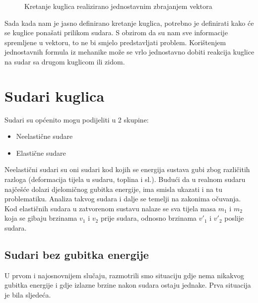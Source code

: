 \begin{figure}[!http]
	\begin{center}
	\end{center}
	\caption {Kretanje kuglica realizirano jednostavnim zbrajanjem vektora}
	\label{fig:14}
\end{figure}

Sada kada nam je jasno definirano kretanje kuglica, potrebno je definirati kako će se kuglice ponašati prilikom sudara. S obzirom da su nam sve informacije spremljene u vektoru, to ne bi smjelo predstavljati problem. Korištenjem jednostavnih formula iz mehanike može se vrlo jednostavno dobiti reakcija kuglice na sudar sa drugom kuglicom ili zidom.

\section{Sudari kuglica}

Sudari su općenito mogu podijeliti u 2 skupine:
\begin{itemize}
	\item Neelastične sudare
	\item Elastične sudare
\end{itemize}
Neelastični sudari su oni sudari kod kojih se energija sustava gubi zbog različitih razloga (deformacija tijela u sudaru, toplina i sl.). Budući da u realnom sudaru najčešće dolazi djelomičnog gubitka energije, ima smisla ukazati i na tu problematiku\cite{9}. Analiza takvog sudara i dalje se temelji na zakonima očuvanja. Kod elastičnih sudara u zatvorenom sustavu nalaze se sva tijela masa $m_{1}$ i $m_{2}$ koja se gibaju brzinama $v_{1}$ i $v_{2}$ prije sudara, odnosno brzinama $v'_{1}$ i $v'_{2}$ poslije sudara\cite{9}.
\subsection{Sudari bez gubitka energije} \label{subsec:no_energy}
U prvom i najosnovnijem slučaju, razmotrili smo situaciju gdje nema nikakvog gubitka energije i gdje izlazne brzine nakon sudara ostaju jednake. Prva situacija je bila sljedeća.

